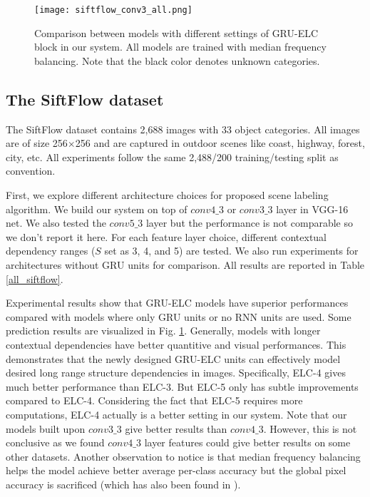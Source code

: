 \documentclass[10pt,twocolumn,letterpaper]{article}
\begin{document}
\begin{figure}
\begin{center}
   \texttt{[image: siftflow\_conv3\_all.png]}
\end{center}
   \caption{Comparison between models with different settings of GRU-ELC block in our system. All models are trained with median frequency balancing. Note that the black color denotes unknown categories.}
\label{fig:siftflow_conv3_all}
\end{figure}



\subsection{The SiftFlow dataset}
The SiftFlow dataset contains 2,688 images with 33 object categories. All images are of size 256$\times$256 and are captured in outdoor scenes like coast, highway, forest, city, etc. All experiments follow the same 2,488/200 training/testing split as convention.

First, we explore different architecture choices for proposed scene labeling algorithm. We build our system on top of $conv4\_3$ or $conv3\_3$ layer in VGG-16 net. We also tested the $conv5\_3$ layer but the performance is not comparable so we don't report it here. For each feature layer choice, different contextual dependency ranges ($S$ set as 3, 4, and 5) are tested. We also run experiments for architectures without GRU units for comparison. All results are reported in Table \ref{all_siftflow}. 

Experimental results show that GRU-ELC models have superior performances compared with models where only GRU units or no RNN units are used. Some prediction results are visualized in Fig. \ref{fig:siftflow_conv3_all}. Generally, models with longer contextual dependencies have better quantitive and visual performances. This demonstrates that the newly designed GRU-ELC units can effectively model desired long range structure dependencies in images. Specifically, ELC-4 gives much better performance than ELC-3. But ELC-5 only has subtle improvements compared to ELC-4. Considering the fact that ELC-5 requires more computations, ELC-4 actually is a better setting in our system. Note that our models built upon $conv3\_3$ give better results than $conv4\_3$. However, this is not conclusive as we found $conv4\_3$ layer features could give better results on some other datasets. Another observation to notice is that median frequency balancing helps the model achieve better average per-class accuracy but the global pixel accuracy is sacrificed (which has also been found in \cite{5, 2, 1, 36}).
\end{document}
